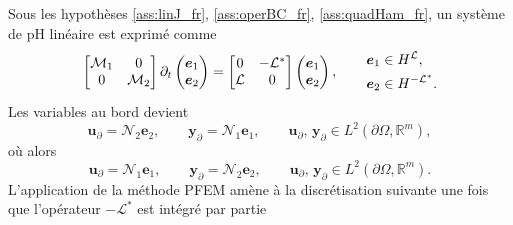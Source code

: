 Sous les hypothèses \ref{ass:linJ_fr}, \ref{ass:operBC_fr}, \ref{ass:quadHam_fr}, un système de pH linéaire est exprimé comme
\begin{equation*}
\begin{bmatrix}
\mathcal{M}_1 & 0 \\
0 & \mathcal{M}_2 \\
\end{bmatrix}
\partial_t \begin{pmatrix}
\bm{e}_1 \\ \bm{e}_2
\end{pmatrix} = \begin{bmatrix}
0 & - \mathcal{L}^* \\
\mathcal{L} & 0 \\
\end{bmatrix}\begin{pmatrix}
\bm{e}_1 \\ \bm{e}_2
\end{pmatrix} , \qquad \begin{aligned}
\bm{e}_1 &\in H^{\mathcal{L}}, 	\\
\bm{e}_2 &\in H^{-\mathcal{L}^*}.
\end{aligned}\\
\end{equation*}
Les variables au bord devient
\begin{equation*}
\bm{u}_\partial = \mathcal{N}_2 \displaystyle \bm{e}_2, \qquad  \bm{y}_\partial = \mathcal{N}_1 \displaystyle \bm{e}_1, \qquad  \bm{u}_\partial,\, \bm{y}_\partial \in L^2(\partial\Omega, \mathbb{R}^m),
\end{equation*}
où alors
\begin{equation*}
\bm{u}_\partial = \mathcal{N}_1 \displaystyle \bm{e}_1, \qquad 
\bm{y}_\partial = \mathcal{N}_2 \displaystyle \bm{e}_2, \qquad  \bm{u}_\partial,\, \bm{y}_\partial \in L^2(\partial\Omega, \mathbb{R}^m). 
\end{equation*}
L'application de la méthode PFEM amène à la discrétisation suivante une fois que l'opérateur $-\mathcal{L}^*$ est intégré par partie
